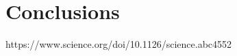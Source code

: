 \documentclass[../main.tex]{subfiles}
\begin{document}
\chapter{Conclusions}
\graphicspath{{./figures/7-Conclusions}}
\minitocpage

https://www.science.org/doi/10.1126/science.abc4552
\end{document}
